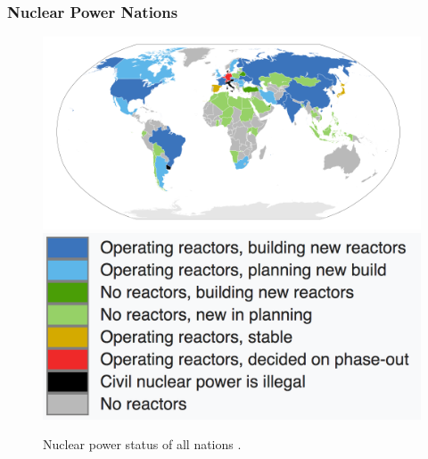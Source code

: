 
\begin{frame}
  \frametitle{Nuclear Power Nations}
  \begin{figure}[htbp!]
    \begin{center}
      \includegraphics[width=\textwidth]{./images/nuclear-nations-map.png}\\

\vspace{-10mm}
      \includegraphics[height=0.2\textheight]{./images/nuclear-nations-legend.png}
    \end{center}
          \caption{Nuclear power status of all nations 
          \cite{paleogene_file:nuclear_2017}.}
    \label{fig:nuc-nations-map}
  \end{figure}
\end{frame}


